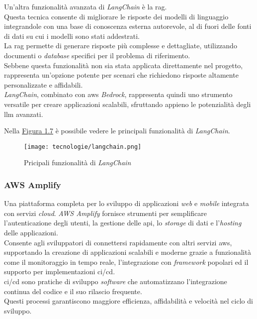 \noindent Un'altra funzionalità avanzata di \textit{LangChain} è la \gls{rag}. \\
Questa tecnica consente di migliorare le risposte dei modelli di linguaggio integrandole con una base di conoscenza esterna autorevole, al di fuori delle fonti di dati su cui i modelli sono stati addestrati.\\
La \gls{rag} permette di generare risposte più complesse e dettagliate, utilizzando documenti o \textit{database} specifici per il problema di riferimento.\\
Sebbene questa funzionalità non sia stata applicata direttamente nel progetto, rappresenta un'opzione potente per scenari che richiedono risposte altamente personalizzate e affidabili.\\
\textit{LangChain}, combinato con \gls{aws} \textit{Bedrock}, rappresenta quindi uno strumento versatile per creare applicazioni scalabili, sfruttando appieno le potenzialità degli \gls{llm} avanzati.

\noindent Nella {\hyperref[fig:langchain-usecases]{Figura 1.7}} è possibile vedere le principali funzionalità di \textit{LangChain}.


\begin{figure}[H]
    \label{fig:langchain-usecases}
    \centering
    \texttt{[image: tecnologie/langchain.png]}
    \caption{Pricipali funzionalità di \textit{LangChain}}
    \cite{site:key-features-langchain}
\end{figure}

\subsubsection{AWS Amplify}

Una piattaforma completa per lo sviluppo di applicazioni \textit{web} e \textit{mobile} integrata con servizi \textit{cloud}.
\textit{AWS Amplify} fornisce strumenti per semplificare l’autenticazione degli utenti, la gestione delle \gls{api}, lo \textit{storage} di dati e l'\textit{hosting} delle applicazioni.\\

\noindent Consente agli sviluppatori di connettersi rapidamente con altri servizi \gls{aws}, supportando la creazione di applicazioni scalabili e moderne grazie a funzionalità come il monitoraggio in tempo reale, 
l’integrazione con \textit{framework} popolari ed il supporto per implementazioni \gls{ci/cd}.\\

\noindent \gls{ci/cd} sono pratiche di sviluppo \textit{software} che automatizzano l'integrazione continua del codice e il suo rilascio frequente. \\
Questi processi garantiscono maggiore efficienza, affidabilità e velocità nel ciclo di sviluppo.

